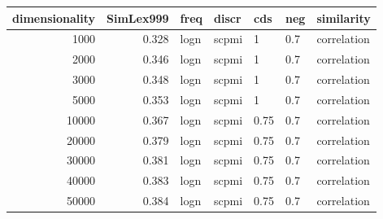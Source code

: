 \begin{tabular}{rrlllll}
\toprule
 dimensionality &  SimLex999 &  freq &  discr &   cds &  neg &   similarity \\
\midrule
           1000 &      0.328 &  logn &  scpmi &     1 &  0.7 &  correlation \\
           2000 &      0.346 &  logn &  scpmi &     1 &  0.7 &  correlation \\
           3000 &      0.348 &  logn &  scpmi &     1 &  0.7 &  correlation \\
           5000 &      0.353 &  logn &  scpmi &     1 &  0.7 &  correlation \\
          10000 &      0.367 &  logn &  scpmi &  0.75 &  0.7 &  correlation \\
          20000 &      0.379 &  logn &  scpmi &  0.75 &  0.7 &  correlation \\
          30000 &      0.381 &  logn &  scpmi &  0.75 &  0.7 &  correlation \\
          40000 &      0.383 &  logn &  scpmi &  0.75 &  0.7 &  correlation \\
          50000 &      0.384 &  logn &  scpmi &  0.75 &  0.7 &  correlation \\
\bottomrule
\end{tabular}

